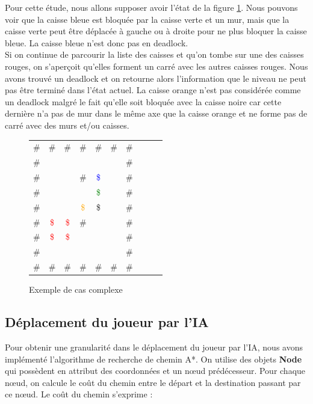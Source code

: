\documentclass[a4paper,12pt]{article} %
\begin{document}
Pour cette étude, nous allons supposer avoir l'état de la figure \ref{DLCompl}. Nous pouvons voir que la caisse bleue est bloquée par la caisse verte et un mur, mais que la caisse verte peut être déplacée à gauche ou à droite pour ne plus bloquer la caisse bleue. La caisse bleue n'est donc pas en deadlock.\\
Si on continue de parcourir la liste des caisses et qu'on tombe sur une des caisses rouges, on s'aperçoit qu'elles forment un carré avec les autres caisses rouges. Nous avons trouvé un deadlock et on retourne alors l'information que le niveau ne peut pas être terminé dans l'état actuel. La caisse orange n'est pas considérée comme un deadlock malgré le fait qu'elle soit bloquée avec la caisse noire car cette dernière n'a pas de mur dans le même axe que la caisse orange et ne forme pas de carré avec des murs et/ou caisses.

\begin{figure}[!h]
\centering
\begin{tabular}{ l*{4} c*{5} r }
\# & \# & \# & \# & \# & \# & \#\\
\# & \ & \ & \ & \ & \ & \#\\
\# & \  & \  & \# & \textcolor{blue}{\$} & \ & \#\\
\# & \  & \  & \  & \textcolor{green}{\$} & \ & \#\\
\# & \  & \  & \textcolor{orange}{\$} & \$ & \ & \#\\
\# & \textcolor{red}{\$} & \textcolor{red}{\$} & \# & \ & \ & \#\\
\# & \textcolor{red}{\$} & \textcolor{red}{\$} & \  & \ & \ & \#\\
\# & \ & \ & \ & \ & \ & \#\\
\# & \# & \# & \# & \# & \# & \#\\
\end{tabular}
\caption{Exemple de cas complexe}
\label{DLCompl}
\end{figure}

\subsection{Déplacement du joueur par l'IA}\label{astar}

Pour obtenir une granularité dans le déplacement du joueur par l'IA, nous avons implémenté l'algorithme de recherche de chemin A*. On utilise des objets \textbf{Node} qui possèdent en attribut des coordonnées et un nœud prédécesseur. Pour chaque nœud, on calcule le coût du chemin entre le départ et la destination passant par ce nœud. Le coût du chemin s'exprime :
\end{document}
